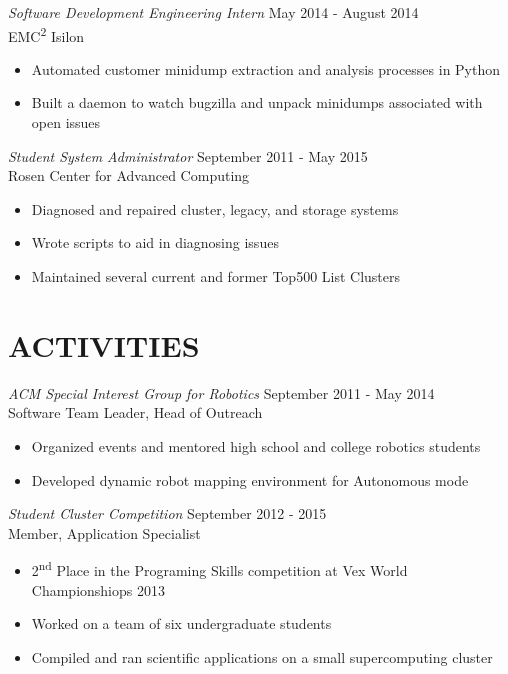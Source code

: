 \documentclass[line,margin]{res}
\begin{document}
\begin{resume}
    {\sl Software Development Engineering Intern} \hfill May 2014 - August 2014 \\
      EMC\textsuperscript{2} Isilon
      \begin{itemize}  \itemsep -2pt
        \item Automated customer minidump extraction and analysis processes in Python
        \item Built a daemon to watch bugzilla and unpack minidumps associated with open issues
      \end{itemize}

    {\sl Student System Administrator} \hfill September 2011 - May 2015 \\
      Rosen Center for Advanced Computing
      \begin{itemize}  \itemsep -2pt %
        \item Diagnosed and repaired cluster, legacy, and storage systems
        \item Wrote scripts to aid in diagnosing issues
        \item Maintained several current and former Top500 List Clusters
      \end{itemize}

  \section{\textcolor{TealBlue}{ACTIVITIES}}
    {\sl ACM Special Interest Group for Robotics} \hfill September 2011 - May 2014 \\
      Software Team Leader, Head of Outreach
      \begin{itemize}  \itemsep -2pt %
        \item Organized events and mentored high school and college robotics students
        \item Developed dynamic robot mapping environment for Autonomous mode
      \end{itemize}
    
    {\sl Student Cluster Competition} \hfill September 2012 - 2015 \\
      Member, Application Specialist
      \begin{itemize}  \itemsep -2pt %
        \item 2\textsuperscript{nd} Place in the Programing Skills competition at Vex World Championshiops 2013
        \item Worked on a team of six undergraduate students
        \item Compiled and ran scientific applications on a small supercomputing cluster
      \end{itemize}
  

\end{resume}
\end{document}
